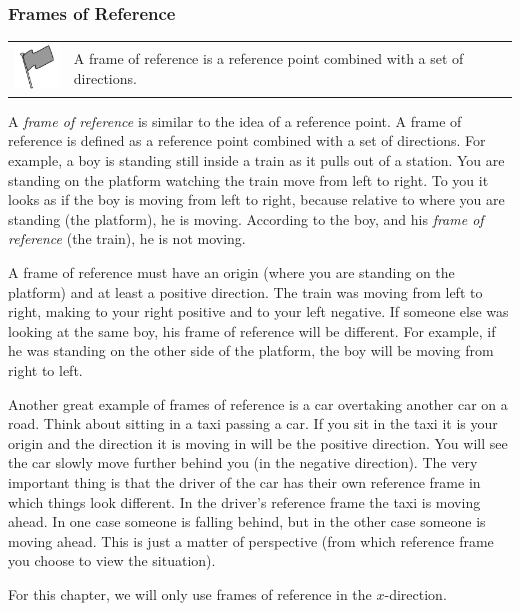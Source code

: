             \subsubsection{ Frames of Reference}
            \nopagebreak
\par
            \label{m38787*fhsst!!!underscore!!!id82}\begin{definition}
	  \begin{tabular*}{15 cm}{m{15 mm}m{}}
	\hspace*{-50pt}  \includegraphics[width=0.5in]{col11305.imgs/psflag2.png}   & \Definition{   \label{id2526298}\textbf{ Frame of Reference }} { \label{m38787*meaningfhsst!!!underscore!!!id82}
        \label{m38787*id62637}A frame of reference is a reference point combined with a set of directions. \par 
         } 
      \end{tabular*}
      \end{definition}
        \label{m38787*id62648}A \textsl{frame of reference} is similar to the idea of a reference point. A frame of reference is defined as a reference point combined with a set of directions. For example, a boy is standing still inside a train as it pulls out of a station. You are standing on the platform watching the train move from left to right. To you it looks as if the boy is moving from left to right, because relative to where you are standing (the platform), he is moving. According to the boy, and his \textsl{frame of reference} (the train), he is not moving.\par 
        \label{m38787*id62666}A frame of reference must have an origin (where you are standing on the platform) and at least a positive direction. The train was moving from left to right, making to your right positive and to your left negative. If someone else was looking at the same boy, his frame of reference will be different. For example, if he was standing on the other side of the platform, the boy will be moving from right to left.\par 
        \label{m38787*eip-271}Another great example of frames of reference is a car overtaking another car on a road. Think about sitting in a taxi passing a car. If you sit in the taxi it is your origin and the direction it is moving in will be the positive direction. You will see the car slowly move further behind you (in the negative direction). The very important thing is that the driver of the car has their own reference frame in which things look different. In the driver's reference frame the taxi is moving ahead. In one case someone is falling behind, but in the other case someone is moving ahead. This is just a matter of perspective (from which reference frame you choose to view the situation).\par \label{m38787*id62675}For this chapter, we will only use frames of reference in the $x$-direction.
